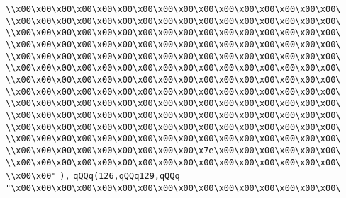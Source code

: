 \verb|\\x00\x00\x00\x00\x00\x00\x00\x00\x00\x00\x00\x00\x00\x00\x00\x00\|\newline
\verb|\\x00\x00\x00\x00\x00\x00\x00\x00\x00\x00\x00\x00\x00\x00\x00\x00\|\newline
\verb|\\x00\x00\x00\x00\x00\x00\x00\x00\x00\x00\x00\x00\x00\x00\x00\x00\|\newline
\verb|\\x00\x00\x00\x00\x00\x00\x00\x00\x00\x00\x00\x00\x00\x00\x00\x00\|\newline
\verb|\\x00\x00\x00\x00\x00\x00\x00\x00\x00\x00\x00\x00\x00\x00\x00\x00\|\newline
\verb|\\x00\x00\x00\x00\x00\x00\x00\x00\x00\x00\x00\x00\x00\x00\x00\x00\|\newline
\verb|\\x00\x00\x00\x00\x00\x00\x00\x00\x00\x00\x00\x00\x00\x00\x00\x00\|\newline
\verb|\\x00\x00\x00\x00\x00\x00\x00\x00\x00\x00\x00\x00\x00\x00\x00\x00\|\newline
\verb|\\x00\x00\x00\x00\x00\x00\x00\x00\x00\x00\x00\x00\x00\x00\x00\x00\|\newline
\verb|\\x00\x00\x00\x00\x00\x00\x00\x00\x00\x00\x00\x00\x00\x00\x00\x00\|\newline
\verb|\\x00\x00\x00\x00\x00\x00\x00\x00\x00\x00\x00\x00\x00\x00\x00\x00\|\newline
\verb|\\x00\x00\x00\x00\x00\x00\x00\x00\x00\x00\x00\x00\x00\x00\x00\x00\|\newline
\verb|\\x00\x00\x00\x00\x00\x00\x00\x00\x00\x7e\x00\x00\x00\x00\x00\x00\|\newline
\verb|\\x00\x00\x00\x00\x00\x00\x00\x00\x00\x00\x00\x00\x00\x00\x00\x00\|\newline
\verb|\\x00\x00"|\newline
\verb|),|\newline
\verb|qQQq(126,qQQq129,qQQq|\newline
\verb|"\x00\x00\x00\x00\x00\x00\x00\x00\x00\x00\x00\x00\x00\x00\x00\x00\|\newline
